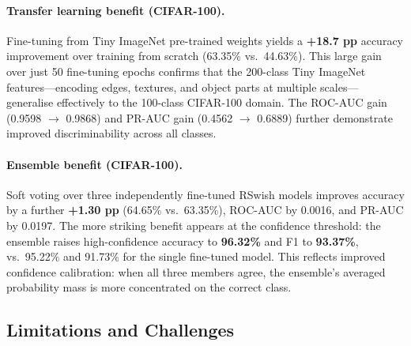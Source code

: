 \documentclass[11pt,letterpaper]{article}
\begin{document}
\paragraph{Transfer learning benefit (CIFAR-100).}
Fine-tuning from Tiny ImageNet pre-trained weights yields a \textbf{+18.7 pp}
accuracy improvement over training from scratch (63.35\% vs.\ 44.63\%).
This large gain over just 50 fine-tuning epochs confirms that the 200-class Tiny
ImageNet features---encoding edges, textures, and object parts at multiple
scales---generalise effectively to the 100-class CIFAR-100 domain.
The ROC-AUC gain (0.9598 $\to$ 0.9868) and PR-AUC gain (0.4562 $\to$ 0.6889)
further demonstrate improved discriminability across all classes.

\paragraph{Ensemble benefit (CIFAR-100).}
Soft voting over three independently fine-tuned RSwish models improves accuracy by
a further \textbf{+1.30 pp} (64.65\% vs.\ 63.35\%), ROC-AUC by 0.0016, and PR-AUC
by 0.0197.
The more striking benefit appears at the confidence threshold:
the ensemble raises high-confidence accuracy to \textbf{96.32\%} and F1 to
\textbf{93.37\%}, vs.\ 95.22\% and 91.73\% for the single fine-tuned model.
This reflects improved confidence calibration: when all three members agree, the
ensemble's averaged probability mass is more concentrated on the correct class.

\subsection{Limitations and Challenges}
\end{document}

